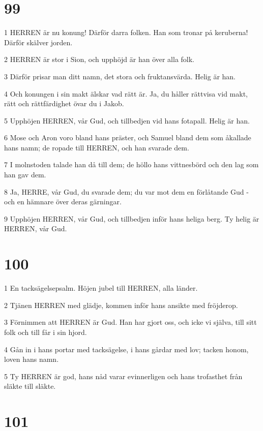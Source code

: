 \chapter{99}

\par 1 HERREN är nu konung! Därför darra folken. Han som tronar på keruberna! Därför skälver jorden.
\par 2 HERREN är stor i Sion, och upphöjd är han över alla folk.
\par 3 Därför prisar man ditt namn, det stora och fruktansvärda. Helig är han.
\par 4 Och konungen i sin makt älskar vad rätt är. Ja, du håller rättvisa vid makt, rätt och rättfärdighet övar du i Jakob.
\par 5 Upphöjen HERREN, vår Gud, och tillbedjen vid hans fotapall. Helig är han.
\par 6 Mose och Aron voro bland hans präster, och Samuel bland dem som åkallade hans namn; de ropade till HERREN, och han svarade dem.
\par 7 I molnstoden talade han då till dem; de höllo hans vittnesbörd och den lag som han gav dem.
\par 8 Ja, HERRE, vår Gud, du svarade dem; du var mot dem en förlåtande Gud - och en hämnare över deras gärningar.
\par 9 Upphöjen HERREN, vår Gud, och tillbedjen inför hans heliga berg. Ty helig är HERREN, vår Gud.

\chapter{100}

\par 1 En tacksägelsepsalm. Höjen jubel till HERREN, alla länder.
\par 2 Tjänen HERREN med glädje, kommen inför hans ansikte med fröjderop.
\par 3 Förnimmen att HERREN är Gud. Han har gjort oss, och icke vi själva, till sitt folk och till får i sin hjord.
\par 4 Gån in i hans portar med tacksägelse, i hans gårdar med lov; tacken honom, loven hans namn.
\par 5 Ty HERREN är god, hans nåd varar evinnerligen och hans trofasthet från släkte till släkte.

\chapter{101}

